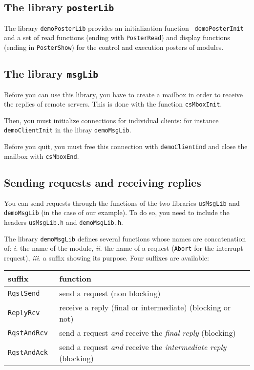 \subsection{The library {\tt posterLib}}

The library {\tt  demoPosterLib} provides an initialization function {\tt
demoPosterInit} and a set of  read functions (ending with {\tt PosterRead})
and display  functions (ending in {\tt  PosterShow}) for the  control and
execution posters of modules.

\subsection{The library {\tt msgLib}}

Before you can use this library, you have to create a mailbox in order to
receive the replies  of remote servers. This is   done with the  function
{\tt csMboxInit}.

Then, you  must  initialize   connections  for individual    clients: for
instance {\tt demoClientInit} in the libray {\tt demoMsgLib}.

Before you  quit, you must  free this connection with {\tt demoClientEnd}
and close the mailbox with {\tt csMboxEnd}.


\subsection{Sending requests and receiving replies}

You   can send requests  through the  functions  of the two
libraries  {\tt usMsgLib}   and {\tt  demoMsgLib}  (in  the case of   our
example). To do so, you need to include the  headers {\tt usMsgLib.h} and
{\tt demoMsgLib.h}.

The library {\tt demoMsgLib}  defines  several functions whose  names are
concatenation of: {\em i.} the name of the module, {\em  ii.} the name of
a request ({\tt  Abort} for the interrupt request),  {\em iii.} a  suffix
showing its purpose. Four suffixes are available:


\begin{center}\small\begin{tabularx}{\linewidth}{|l|X|}
\hline
suffix & function \\
\hline
\tt RqstSend & send a request (non blocking) \\

\tt ReplyRcv & receive a reply (final or intermediate)  (blocking or not)\\

\tt RqstAndRcv & send a request {\em and} receive the {\em final reply}
(blocking) \\

\tt RqstAndAck & send a request {\em and} receive the {\em intermediate reply}
(blocking) \\
\hline
\end{tabularx}\end{center}


